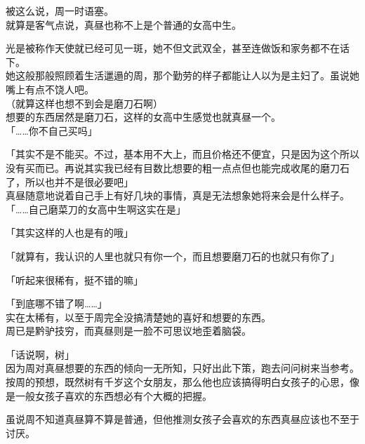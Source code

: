 被这么说，周一时语塞。\\

就算是客气点说，真昼也称不上是个普通的女高中生。

光是被称作天使就已经可见一斑，她不但文武双全，甚至连做饭和家务都不在话下。\\

她这般那般照顾着生活邋遢的周，那个勤劳的样子都能让人以为是主妇了。虽说她嘴上有点不饶人吧。\\

（就算这样也想不到会是磨刀石啊）\\

想要的东西居然是磨刀石，这样的女高中生感觉也就真昼一个。\\

「……你不自己买吗」

「其实不是不能买。不过，基本用不大上，而且价格还不便宜，只是因为这个所以没有买而已。再说其实我已经有目数比想要的粗一点点但也能完成收尾的磨刀石了，所以也并不是很必要吧」\\

真昼随意地说着自己手上有好几块的事情，真是无法想象她将来会是什么样子。\\

「……自己磨菜刀的女高中生啊这实在是」

「其实这样的人也是有的哦」

「就算有，我认识的人里也就只有你一个，而且想要磨刀石的也就只有你了」

「听起来很稀有，挺不错的嘛」

「到底哪不错了啊……」\\

实在太稀有，以至于周完全没搞清楚她的喜好和想要的东西。\\

周已是黔驴技穷，而真昼则是一脸不可思议地歪着脑袋。\\

\vspace{2\baselineskip}

「话说啊，树」\\

因为周对真昼想要的东西的倾向一无所知，只好出此下策，跑去问问树来当参考。\\

按周的预想，既然树有千岁这个女朋友，那么他也应该搞得明白女孩子的心思，像是一般女孩子喜欢的东西想必有个大概的把握。

虽说周不知道真昼算不算是普通，但他推测女孩子会喜欢的东西真昼应该也不至于讨厌。\\

